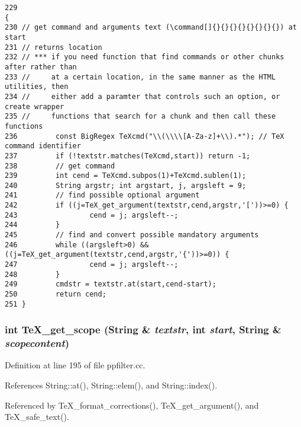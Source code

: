 \footnotesize\begin{verbatim}229                                                                   {
230 // get command and arguments text (\command[]{}{}{}{}{}{}{}{}) at start
231 // returns location
232 // *** if you need function that find commands or other chunks after rather than
233 //     at a certain location, in the same manner as the HTML utilities, then
234 //     either add a paramter that controls such an option, or create wrapper
235 //     functions that search for a chunk and then call these functions
236         const BigRegex TeXcmd("\\(\\\\[A-Za-z]+\\).*"); // TeX command identifier
237         if (!textstr.matches(TeXcmd,start)) return -1;
238         // get command
239         int cend = TeXcmd.subpos(1)+TeXcmd.sublen(1);
240         String argstr; int argstart, j, argsleft = 9;
241         // find possible optional argument
242         if ((j=TeX_get_argument(textstr,cend,argstr,'['))>=0) {
243                 cend = j; argsleft--;
244         }
245         // find and convert possible mandatory arguments
246         while ((argsleft>0) && ((j=TeX_get_argument(textstr,cend,argstr,'{'))>=0)) {
247                 cend = j; argsleft--;
248         }
249         cmdstr = textstr.at(start,cend-start);
250         return cend;
251 }
\end{verbatim}\normalsize 
{}
\subsubsection{\setlength{\rightskip}{0pt plus 5cm}int Te\-X\_\-get\_\-scope ({\bf String} \& {\em textstr}, int {\em start}, {\bf String} \& {\em scopecontent})}\label{dil2al_8hh_a350}




Definition at line 195 of file ppfilter.cc.

References String::at(), String::elem(), and String::index().

Referenced by Te\-X\_\-format\_\-corrections(), Te\-X\_\-get\_\-argument(), and Te\-X\_\-safe\_\-text().



